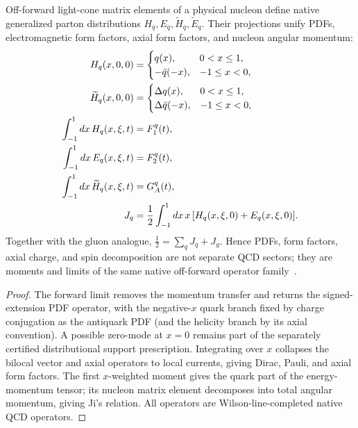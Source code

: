 \documentclass[12pt,a4paper]{article}
\begin{document}
\begin{theorem}
\label{p11:thm:native-gpd-unification-bridge}
Off-forward light-cone matrix elements of a physical nucleon define native generalized parton distributions \(H_q,E_q,\widetilde H_q,\widetilde E_q\).  Their projections unify PDFs, electromagnetic form factors, axial form factors, and nucleon angular momentum:
\begin{align}
H_q(x,0,0)&=\begin{cases}q(x),&0<x\le1,\\-\bar q(-x),&-1\le x<0,\end{cases}\notag\\
\widetilde H_q(x,0,0)&=\begin{cases}\Delta q(x),&0<x\le1,\\\Delta\bar q(-x),&-1\le x<0,\end{cases} \label{p11:eq:gpd-forward-limits}\\
\int_{-1}^{1}dx\,H_q(x,\xi,t)&=F_1^q(t),\notag\\
\int_{-1}^{1}dx\,E_q(x,\xi,t)&=F_2^q(t), \label{p11:eq:gpd-first-moments}\\
\int_{-1}^{1}dx\,\widetilde H_q(x,\xi,t)&=G_A^q(t),\notag\\
J_q&=\frac12\int_{-1}^{1}dx\,x\,[H_q(x,\xi,0)+E_q(x,\xi,0)]. \label{p11:eq:gpd-axial-moment-ji}
\end{align}
Together with the gluon analogue, \(\frac12=\sum_qJ_q+J_g\).  Hence PDFs, form factors, axial charge, and spin decomposition are not separate QCD sectors; they are moments and limits of the same native off-forward operator family~\cite{Ji1997,Radyushkin1997}.
\end{theorem}
\begin{proof}
The forward limit removes the momentum transfer and returns the signed-extension PDF operator, with the negative-$x$ quark branch fixed by charge conjugation as the antiquark PDF (and the helicity branch by its axial convention). A possible zero-mode at $x=0$ remains part of the separately certified distributional support prescription.  Integrating over \(x\) collapses the bilocal vector and axial operators to local currents, giving Dirac, Pauli, and axial form factors.  The first \(x\)-weighted moment gives the quark part of the energy-momentum tensor; its nucleon matrix element decomposes into total angular momentum, giving Ji's relation.  All operators are Wilson-line-completed native QCD operators.
\end{proof}
\end{document}
